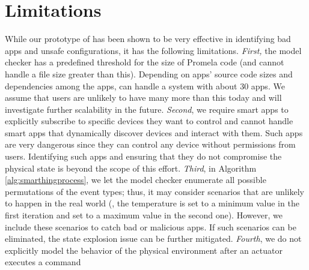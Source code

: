 \section{Limitations}
While our prototype of \sys has been shown to be very effective in
identifying bad apps and unsafe configurations, it has the following limitations.
%
{\em First,} the \spin model checker has a predefined threshold for the size of Promela code
(and cannot handle a file size greater than this).
Depending on apps' source code sizes and dependencies among the apps, \sys can handle a system with about 30 apps.
We assume that users are unlikely to have many more than this today and will investigate further scalability in the future.
%
{\em Second}, we require smart apps to explicitly subscribe to specific devices they want to control
and cannot handle smart apps that dynamically discover devices and interact with them.
Such apps are very dangerous since they can control any device without permissions from users.
Identifying such apps and ensuring that they do not compromise the physical state is beyond the scope of this effort.
%
{\em Third}, in Algorithm \ref{alg:smarthingprocess}, we let the model checker enumerate all possible permutations of the event types;
thus, it may consider scenarios that are unlikely to happen in the real world
(\eg, the temperature is set to a minimum value in the first iteration and set to a maximum value in the second one).
However, we include these scenarios to catch bad or malicious apps.
If such scenarios can be eliminated, the state explosion issue can be further mitigated.
%
{\em Fourth}, we do not explicitly model the behavior of the physical environment after an actuator executes a command
